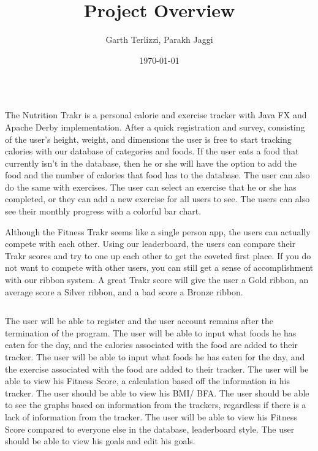 \documentclass[10pt]{article}
\renewenvironment{quote}
  {\begin{tabular}{|p{13cm}}}
  {\end{tabular}}
\begin{document}
\title{Project Overview}



\author{Garth Terlizzi, Parakh Jaggi}%
%


\vspace{-1em}



  \date{\today}


\begingroup
\let\center\flushleft
\let\endcenter\endflushleft
\maketitle
\endgroup








\begin{quote}
\end{quote}

The Nutrition Trakr is a personal calorie and exercise tracker with Java
FX and Apache Derby implementation. After a quick registration and
survey, consisting of the user's height, weight, and dimensions the user
is free to start tracking calories with our database of categories and
foods. If the user eats a food that currently isn't in the database,
then he or she will have the option to add the food and the number of
calories that food has to the database. The user can also do the same
with exercises. The user can select an exercise that he or she has
completed, or they can add a new exercise for all users to see. The
users can also see their monthly progress with a colorful bar chart.

Although the Fitness Trakr seems like a single person app, the users can
actually compete with each other. Using our leaderboard, the users can
compare their Trakr scores and try to one up each other to get the
coveted first place. If you do not want to compete with other users, you
can still get a sense of accomplishment with our ribbon system. A great
Trakr score will give the user a Gold ribbon, an average score a Silver
ribbon, and a bad score a Bronze ribbon.

\begin{quote}
\end{quote}

The user will be able to register and the user account remains after the termination of the program. The user will be able to input what foods he has eaten for the day, and the calories associated with the food are added to their tracker.
The user will be able to input what foods he has eaten for the day, and the exercise associated with the food are added to their tracker.
The user will be able to view his Fitness Score, a calculation based off the information in his tracker.
The user should be able to view his BMI/ BFA.
The user should be able to see the graphs based on information from the trackers, regardless if there is a lack of information from the tracker.
The user will be able to view his Fitness Score compared to everyone else in the database, leaderboard style. 
The user should be able to view his goals and edit his goals.
\end{document}
